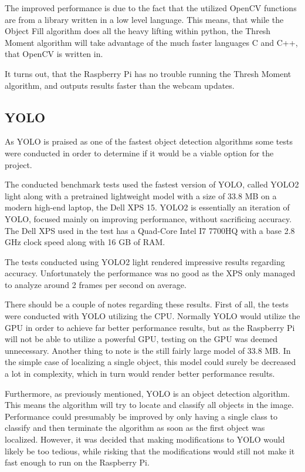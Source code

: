 The improved performance is due to the fact that the utilized OpenCV functions are from a library written in a low level language.
This means, that while the Object Fill algorithm does all the heavy lifting within python, the Thresh Moment algorithm will take advantage of the much faster languages C and C++, that OpenCV is written in.

It turns out, that the Raspberry Pi has no trouble running the Thresh Moment algorithm, and outputs results faster than the webcam updates.

\subsection{YOLO}
As YOLO is praised as one of the fastest object detection algorithms some tests were conducted in order to determine if it would be a viable option for the project\cite{yolospeed}.

The conducted benchmark tests used the fastest version of YOLO, called YOLO2 light along with a pretrained lightweight model with a size of 33.8 MB on a modern high-end laptop, the Dell XPS 15.
YOLO2 is essentially an iteration of YOLO, focused mainly on improving performance, without sacrificing accuracy\cite{yolospeed}.
The Dell XPS used in the test has a Quad-Core Intel I7 7700HQ with a base 2.8 GHz clock speed along with 16 GB of RAM.

The tests conducted using YOLO2 light rendered impressive results regarding accuracy.
Unfortunately the performance was no good as the XPS only managed to analyze around 2 frames per second on average.

There should be a couple of notes regarding these results.
First of all, the tests were conducted with YOLO utilizing the CPU.
Normally YOLO would utilize the GPU in order to achieve far better performance results, but as the Raspberry Pi will not be able to utilize a powerful GPU, testing on the GPU was deemed unnecessary.
Another thing to note is the still fairly large model of 33.8 MB.
In the simple case of localizing a single object, this model could surely be decreased a lot in complexity, which in turn would render better performance results.

Furthermore, as previously mentioned, YOLO is an object detection algorithm.
This means the algorithm will try to locate and classify all objects in the image.
Performance could presumably be improved by only having a single class to classify and then terminate the algorithm as soon as the first object was localized.
However, it was decided that making modifications to YOLO would likely be too tedious, while risking that the modifications would still not make it fast enough to run on the Raspberry Pi.

